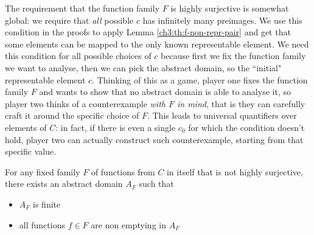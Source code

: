 The requirement that the function family $F$ is highly surjective is somewhat global: we require that \textit{all} possible $c$ has infinitely many preimages.
We use this condition in the proofs to apply Lemma \ref{ch3:th:f-non-repr-pair} and get that some elements can be mapped to the only known representable element. We need this condition for all possible choices of $c$ because first we fix the function family we want to analyse, then we can pick the abstract domain, so the ``initial" representable element $c$.
Thinking of this as a game, player one fixes the function family $F$ and wants to show that no abstract domain is able to analyse it, so player two thinks of a counterexample \textit{with $F$ in mind}, that is they can carefully craft it around the specific choice of $F$. This leads to universal quantifiers over elements of $C$: in fact, if there is even a single $c_0$ for which the condition doesn't hold, player two can actually construct such counterexample, starting from that specific value.
\begin{prop}\label{ch4:th:no-higly-onto-domain-construction}
	For any fixed family $F$ of functions from $C$ in itself that is not highly surjective, there exists an abstract domain $A_F$ such that
	\begin{itemize}
		\item $A_F$ is finite
		\item all functions $f \in F$ are non emptying in $A_F$
	\end{itemize}
\end{prop}
